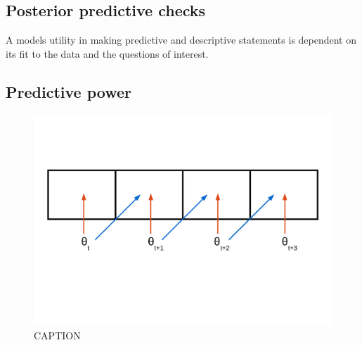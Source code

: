 \documentclass[12pt,letterpaper]{article}
\begin{document}
\subsection{Posterior predictive checks}

A models utility in making predictive and descriptive statements is dependent on its fit to the data and the questions of interest.


\subsection{Predictive power}

\begin{figure}[ht]
  \centering
  \includegraphics[height = 0.5\textheight, width = \textwidth, keepaspectratio = true]{figure/predict_perform}
  \caption{CAPTION}
  \label{fig:concept}
\end{figure}
\end{document}
